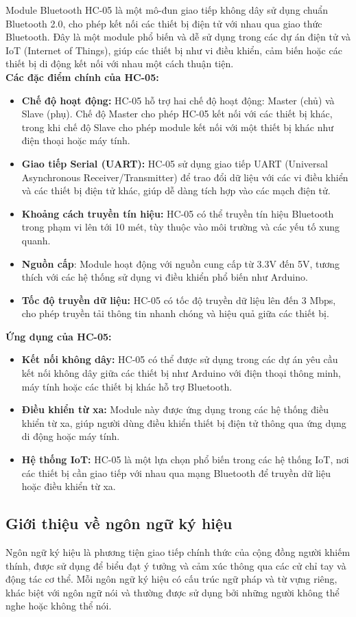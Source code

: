 \indent Module Bluetooth HC-05 là một mô-đun giao tiếp không dây sử dụng chuẩn Bluetooth 2.0, cho phép kết nối các thiết bị điện tử với nhau qua giao thức Bluetooth. Đây là một module phổ biến và dễ sử dụng trong các dự án điện tử và IoT (Internet of Things), giúp các thiết bị như vi điều khiển, cảm biến hoặc các thiết bị di động kết nối với nhau một cách thuận tiện.
\\
\textbf{Các đặc điểm chính của HC-05:}
\begin{itemize}
\item \textbf{Chế độ hoạt động:} HC-05 hỗ trợ hai chế độ hoạt động: Master (chủ) và Slave (phụ). Chế độ Master cho phép HC-05 kết nối với các thiết bị khác, trong khi chế độ Slave cho phép module kết nối với một thiết bị khác như điện thoại hoặc máy tính.
\item \textbf{Giao tiếp Serial (UART):} HC-05 sử dụng giao tiếp UART (Universal Asynchronous Receiver/Transmitter) để trao đổi dữ liệu với các vi điều khiển và các thiết bị điện tử khác, giúp dễ dàng tích hợp vào các mạch điện tử.
 \item \textbf{Khoảng cách truyền tín hiệu:} HC-05 có thể truyền tín hiệu Bluetooth trong phạm vi lên tới 10 mét, tùy thuộc vào môi trường và các yếu tố xung quanh.
\item \textbf{Nguồn cấp}: Module hoạt động với nguồn cung cấp từ 3.3V đến 5V, tương thích với các hệ thống sử dụng vi điều khiển phổ biến như Arduino.
\item \textbf{Tốc độ truyền dữ liệu:} HC-05 có tốc độ truyền dữ liệu lên đến 3 Mbps, cho phép truyền tải thông tin nhanh chóng và hiệu quả giữa các thiết bị.
\end{itemize}
\textbf{Ứng dụng của HC-05:}
\begin{itemize}
\item \textbf{Kết nối không dây:} HC-05 có thể được sử dụng trong các dự án yêu cầu kết nối không dây giữa các thiết bị như Arduino với điện thoại thông minh, máy tính hoặc các thiết bị khác hỗ trợ Bluetooth.
\item \textbf{Điều khiển từ xa:} Module này được ứng dụng trong các hệ thống điều khiển từ xa, giúp người dùng điều khiển thiết bị điện tử thông qua ứng dụng di động hoặc máy tính.
 \item \textbf{Hệ thống IoT:} HC-05 là một lựa chọn phổ biến trong các hệ thống IoT, nơi các thiết bị cần giao tiếp với nhau qua mạng Bluetooth để truyền dữ liệu hoặc điều khiển từ xa.
\end{itemize}
\subsection{Giới thiệu về ngôn ngữ ký hiệu}
\indent Ngôn ngữ ký hiệu là phương tiện giao tiếp chính thức của cộng đồng người khiếm thính, được sử dụng để biểu đạt ý tưởng và cảm xúc thông qua các cử chỉ tay và động tác cơ thể. Mỗi ngôn ngữ ký hiệu có cấu trúc ngữ pháp và từ vựng riêng, khác biệt với ngôn ngữ nói và thường được sử dụng bởi những người không thể nghe hoặc không thể nói.

